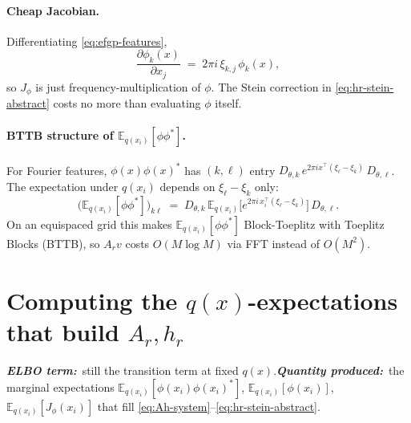 \documentclass[11pt]{article}
\newcommand{\Eqx}{\mathbb{E}_{q(x_i)}}
\newcommand{\elbobanner}[2]{%
\par\noindent\textbf{\textit{ELBO term:}}\ #1\quad\textbf{\textit{Quantity produced:}}\ #2\par\medskip}
\begin{document}
\paragraph{Cheap Jacobian.}
Differentiating \eqref{eq:efgp-features},
\begin{equation}
\frac{\partial \phi_k(x)}{\partial x_j} \;=\; 2\pi i\,\xi_{k,j}\,\phi_k(x),
\label{eq:phi-jac}
\end{equation}
so $J_\phi$ is just frequency-multiplication of $\phi$. The Stein
correction in \eqref{eq:hr-stein-abstract} costs no more than evaluating
$\phi$ itself.

\paragraph{BTTB structure of $\Eqx[\phi\phi^{*}]$.}
For Fourier features, $\phi(x)\phi(x)^{*}$ has $(k,\ell)$ entry
$D_{\theta,k}\,e^{2\pi i x^\top(\xi_\ell-\xi_k)}\,D_{\theta,\ell}$. The
expectation under $q(x_i)$ depends on $\xi_\ell-\xi_k$ only:
\begin{equation}
\bigl(\Eqx[\phi\phi^{*}]\bigr)_{k\ell}
\;=\;
D_{\theta,k}\,\Eqx\!\bigl[e^{2\pi i\,x_i^\top(\xi_\ell-\xi_k)}\bigr]\,D_{\theta,\ell}.
\end{equation}
On an equispaced grid this makes $\Eqx[\phi\phi^{*}]$ Block-Toeplitz with
Toeplitz Blocks (BTTB), so $A_r v$ costs $O(M\log M)$ via FFT instead of
$O(M^2)$.

\section{Computing the $q(x)$-expectations that build $A_r, h_r$}
\label{sec:compute}

\elbobanner{still the transition term at fixed $q(x)$.}{the marginal
expectations $\Eqx[\phi(x_i)\phi(x_i)^*]$, $\Eqx[\phi(x_i)]$,
$\Eqx[J_\phi(x_i)]$ that fill \eqref{eq:Ah-system}–\eqref{eq:hr-stein-abstract}.}
\end{document}
